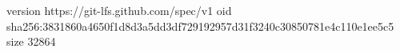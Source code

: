 version https://git-lfs.github.com/spec/v1
oid sha256:3831860a4650f1d8d3a5dd3df729192957d31f3240c30850781e4c110e1ee5c5
size 32864
